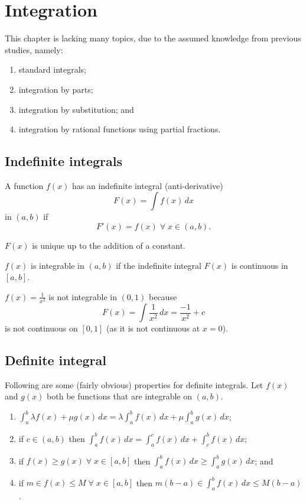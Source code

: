 \chapter{Integration}

This chapter is lacking many topics, due to the assumed knowledge from previous studies, namely:
\begin{enumerate}
    \item standard integrals;
    \item integration by parts;
    \item integration by substitution; and
    \item integration by rational functions using partial fractions.
\end{enumerate}

\section{Indefinite integrals}

\begin{definition}
    A function $f(x)$ has an indefinite integral (anti-derivative) \[F(x)=\int{f(x)\,dx}\] in $(a,b)$ if \[F'(x)=f(x)\;\forall\;x\in(a,b).\]
\end{definition}

\begin{remark}
    $F(x)$ is unique up to the addition of a constant.
\end{remark}

\begin{definition}
    $f(x)$ is integrable in $(a,b)$ if the indefinite integral $F(x)$ is continuous in $[a,b]$.
\end{definition}

\begin{example}
    $f(x)=\frac1{x^2}$ is not integrable in $(0,1)$ because \[F(x)=\int\dfrac1{x^2}\,dx=\dfrac{-1}{x^2}+c\] is not continuous on $[0,1]$ (as it is not continuous at $x=0$).
\end{example}

\section{Definite integral}

Following are some (fairly obvious) properties for definite integrals. Let $f(x)$ and $g(x)$ both be functions that are integrable on $(a,b)$.

\begin{enumerate}
    \item $\int_a^b{\lambda f(x)+\mu g(x)\,dx}=\lambda\int^b_af(x)\,dx+\mu\int^b_ag(x)\,dx$;
    \item if $c\in(a,b)$ then $\int^b_a{f(x)\,dx}=\int^c_a{f(x)\,dx}+\int^b_c{f(x)\,dx}$;
    \item if $f(x)\geq g(x)\;\forall\;x\in[a,b]$ then $\int^b_a{f(x)\,dx}\geq\int^b_a{g(x)\,dx}$; and
    \item if $m\in f(x)\leq M\;\forall\; x\in[a,b]$ then $m(b-a)\in\int^b_a{f(x)\,dx}\leq M(b-a)$.
\end{enumerate}


